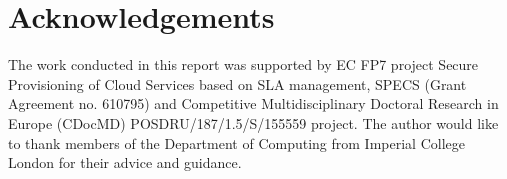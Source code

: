 \section*{Acknowledgements}

The work conducted in this report was supported by EC FP7 project Secure Provisioning of Cloud Services based on SLA management, SPECS (Grant Agreement no. 610795) and Competitive Multidisciplinary Doctoral Research in Europe (CDocMD) POSDRU/187/1.5/S/155559 project. The author would like to thank members of the Department of Computing from Imperial College London for their advice and guidance.
